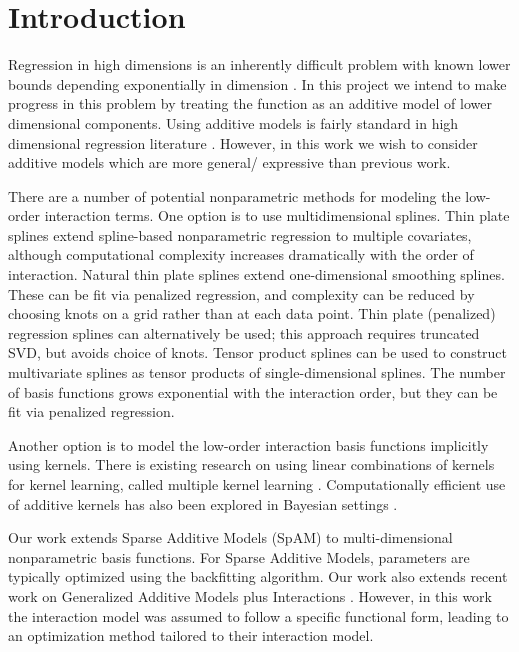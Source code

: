 

\section{Introduction}

Regression in high dimensions is an inherently difficult problem with known
lower bounds depending exponentially in dimension
\citep{gyorfi02distributionfree}. In this
project we intend to make progress in this problem by treating the function as
an additive model of lower dimensional components.
Using additive models is fairly standard in high dimensional regression
literature \cite{hastie90gam,ravikumar09spam,lafferty05rodeo}. However, in this
work we wish to consider additive models which are more general/ expressive than
previous work.

There are a number of potential nonparametric methods for modeling the low-order interaction terms.
One option is to use multidimensional splines. 
Thin plate splines \citep{thin-plate-splines:2003} extend 
spline-based nonparametric regression to multiple covariates,
although computational complexity increases dramatically with the order of interaction.
Natural thin plate splines extend one-dimensional smoothing splines.
These can be fit via penalized regression, and
complexity can be reduced by choosing knots on a grid rather than at each data point.
Thin plate (penalized) regression splines can alternatively be used;
this approach requires truncated SVD, but avoids choice of knots.
Tensor product splines \citep{tensor-product-splines:1994} can be used to construct 
multivariate splines as tensor products of single-dimensional splines.
The number of basis functions grows exponential with the interaction order, 
but they can be fit via penalized regression.


Another option is to model the low-order interaction basis functions implicitly using kernels.
There is existing research on using linear combinations of kernels for kernel learning,
called multiple kernel learning \citep{mkl-review:2011}.
Computationally efficient use of additive kernels has also been explored 
in Bayesian settings \citep{duvenaud11additivegps}.

Our work extends Sparse Additive Models (SpAM) \citep{ravikumar09spam} 
to multi-dimensional nonparametric basis functions.
For Sparse Additive Models, parameters are typically optimized using the backfitting algorithm.
Our work also extends recent work on 
Generalized Additive Models plus Interactions \citep{intelligible:2013}.
However, in this work the interaction model was assumed to follow a specific functional form,
leading to an optimization method tailored to their interaction model.
